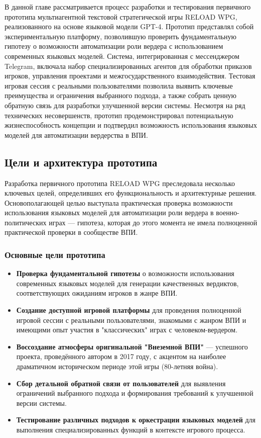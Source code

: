 В данной главе рассматривается процесс разработки и тестирования первичного прототипа мультиагентной текстовой стратегической игры RELOAD WPG, реализованного на основе языковой модели GPT-4. Прототип представлял собой экспериментальную платформу, позволившую проверить фундаментальную гипотезу о возможности автоматизации роли вердера с использованием современных языковых моделей. Система, интегрированная с мессенджером Telegram, включала набор специализированных агентов для обработки приказов игроков, управления проектами и межгосударственного взаимодействия. Тестовая игровая сессия с реальными пользователями позволила выявить ключевые преимущества и ограничения выбранного подхода, а также собрать ценную обратную связь для разработки улучшенной версии системы. Несмотря на ряд технических несовершенств, прототип продемонстрировал потенциальную жизнеспособность концепции и подтвердил возможность использования языковых моделей для автоматизации вердерства в ВПИ.
\subsection{Цели и архитектура прототипа}

Разработка первичного прототипа RELOAD WPG преследовала несколько ключевых целей, определивших его функциональность и архитектурные решения. Основополагающей целью выступала практическая проверка возможности использования языковых моделей для автоматизации роли вердера в военно-политических играх — гипотеза, которая до этого момента не имела полноценной практической проверки в сообществе ВПИ.

\subsubsection{Основные цели прототипа}

\begin{itemize}
    \item \textbf{Проверка фундаментальной гипотезы} о возможности использования современных языковых моделей для генерации качественных вердиктов, соответствующих ожиданиям игроков в жанре ВПИ.

    \item \textbf{Создание доступной игровой платформы} для проведения полноценной игровой сессии с реальными пользователями, знакомыми с жанром ВПИ и имеющими опыт участия в "{}классических"{} играх с человеком-вердером.

    \item \textbf{Воссоздание атмосферы оригинальной "{}Внеземной ВПИ"{}} — успешного проекта, проведённого автором в 2017 году, с акцентом на наиболее драматичном историческом периоде этой игры (80-летняя война).

    \item \textbf{Сбор детальной обратной связи от пользователей} для выявления ограничений выбранного подхода и формирования требований к улучшенной версии системы.

    \item \textbf{Тестирование различных подходов к оркестрации языковых моделей} для выполнения специализированных функций в контексте игрового процесса.
\end{itemize}

